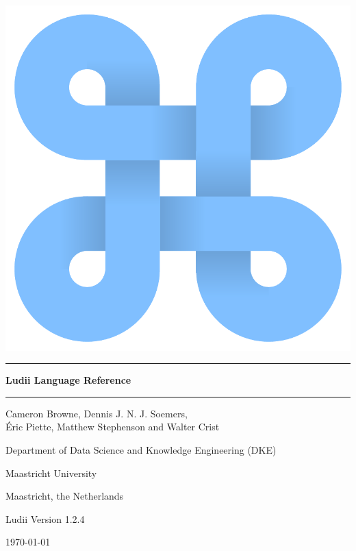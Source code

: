 \documentclass[10pt,twoside]{report}
\begin{document}
\texttt{\hyphenchar{} }

\thispagestyle{empty}

\begin{centering}

\includegraphics[scale=0.35]{figs/ludii-icon-1.pdf}


\vspace{30mm}
\noindent\rule{14.5cm}{0.5pt}

\vspace{5mm}
{\Huge \bf Ludii Language Reference}

\vspace{2mm}
\noindent\rule{14.5cm}{0.5pt}
 
 
\vspace{10mm}
{\Large Cameron Browne, Dennis J. N. J. Soemers,\\ {\'E}ric Piette, Matthew Stephenson and Walter Crist}

\vspace{10mm}
{\large Department of Data Science and Knowledge Engineering (DKE)}
 
\vspace{1mm}
{\large Maastricht University}

\vspace{1mm}
{\large Maastricht, the Netherlands}

\vspace{10mm}
{\large Ludii Version 1.2.4}

\vspace{1mm}
{\large \today}

\pagebreak

\end{centering}
\end{document}
